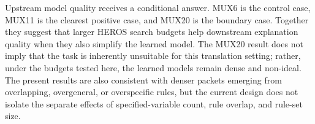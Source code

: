 \documentclass[sigconf]{acmart}
\begin{document}
Upstream model quality receives a conditional answer. MUX6 is the control case, MUX11 is the clearest positive case, and MUX20 is the boundary case. Together they suggest that larger HEROS search budgets help downstream explanation quality when they also simplify the learned model. The MUX20 result does not imply that the task is inherently unsuitable for this translation setting; rather, under the budgets tested here, the learned models remain dense and non-ideal. The present results are also consistent with denser packets emerging from overlapping, overgeneral, or overspecific rules, but the current design does not isolate the separate effects of specified-variable count, rule overlap, and rule-set size.

\end{document}
